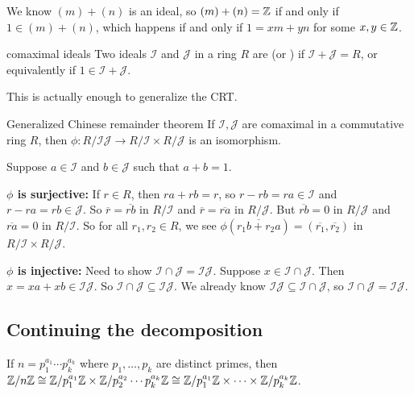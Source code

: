 \documentclass[12pt,letterpaper]{report}
\begin{document}
\begin{thmproof}
  We know $(m) + (n)$ is an ideal, so $(m) + (n) = \mathbb{Z}$ if and only if $1 \in (m) + (n)$, which
  happens if and only if $1 = xm + yn$ for some $x, y \in \mathbb{Z}$.
\end{thmproof}

\begin{defn}{comaximal ideals}{}
  Two ideals $\mathcal{I}$ and $\mathcal{J}$ in a ring $R$ are 
  (or ) if $\mathcal{I} + \mathcal{J} = R$, or equivalently if
  $1 \in \mathcal{I} + \mathcal{J}$.
\end{defn}

This is actually enough to generalize the CRT.

\begin{thm}{Generalized Chinese remainder theorem}{}
  If $\mathcal{I}, \mathcal{J}$ are comaximal in a commutative ring $R$, then
  $\phi \colon R/\mathcal{IJ} \to R/\mathcal{I} \times R/\mathcal{J}$ is an isomorphism.
\end{thm}

\begin{thmproof}
  Suppose $a \in \mathcal{I}$ and $b \in \mathcal{J}$ such that $a + b = 1$.

  \textbf{$\phi$ is surjective:}
  If $r \in R$, then $ra + rb = r$, so $r - rb = ra \in \mathcal{I}$ and
  $r - ra = rb \in \mathcal{J}$.
  So $\overline{r} = \overline{rb}$ in $R/\mathcal{I}$ and $\overline{r} = \overline{ra}$ in
  $R/\mathcal{J}$.
  But $\overline{rb} = 0$ in $R/\mathcal{J}$ and $\overline{ra} = 0$ in $R/\mathcal{I}$.
  So for all $r_1, r_2 \in R$, we see
  $\phi(\overline{r_1b + r_2a}) = (\overline{r_1}, \overline{r_2})$ in
  $R/\mathcal{I} \times R/\mathcal{J}$.

  \textbf{$\phi$ is injective:}
  Need to show $\mathcal{I} \cap \mathcal{J} = \mathcal{IJ}$.
  Suppose $x \in \mathcal{I} \cap \mathcal{J}$.
  Then $x = xa + xb \in \mathcal{IJ}$.
  So $\mathcal{I} \cap \mathcal{J} \subseteq \mathcal{IJ}$.
  We already know $\mathcal{IJ} \subseteq \mathcal{I} \cap \mathcal{J}$, so
  $\mathcal{I} \cap \mathcal{J} = \mathcal{IJ}$.
\end{thmproof}

\pagebreak
\subsection{Continuing the decomposition}

If $n = p_1^{a_1} \cdots p_k^{a_k}$ where $p_1, \ldots, p_k$ are distinct primes, then
$\mathbb{Z}/{n}\mathbb{Z} \cong \mathbb{Z}/{p_1^{a_1}}\mathbb{Z} \times \mathbb{Z}/{p_2^{a_2} \cdots p_k^{a_k}}\mathbb{Z} \cong
  \mathbb{Z}/{p_1^{a_1}}\mathbb{Z} \times \cdots \times \mathbb{Z}/{p_k^{a_k}}\mathbb{Z}$.
\end{document}
